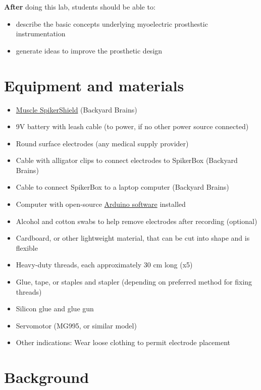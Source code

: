\documentclass{article}
\begin{document}
\textbf{After} doing this lab, students should be able to:

\begin{itemize}
\item describe the basic concepts underlying myoelectric prosthestic instrumentation
\item generate ideas to improve the prosthetic design
\end{itemize}

\section{Equipment and materials}

\begin{itemize}
\item \href{https://docs.backyardbrains.com/retired/products/musclespikershieldbundle}{Muscle SpikerShield} (Backyard Brains)
\item 9V battery with leash cable (to power, if no other power source connected)
\item Round surface electrodes (any medical supply provider)
\item Cable with alligator clips to connect electrodes to SpikerBox (Backyard Brains)
\item Cable to connect SpikerBox to a laptop computer (Backyard Brains)
\item Computer with open-source \href{https://docs.arduino.cc/software}{Arduino software} installed
\item Alcohol and cotton swabs to help remove electrodes after recording (optional)
\item Cardboard, or other lightweight material, that can be cut into shape and is flexible
\item Heavy-duty threads, each approximately 30 cm long (x5)
\item Glue, tape, or staples and stapler (depending on preferred method for fixing threads)
\item Silicon glue and glue gun
\item Servomotor (MG995, or similar model)
\item Other indications: Wear loose clothing to permit electrode placement
\end{itemize}

\section{Background}
\end{document}
